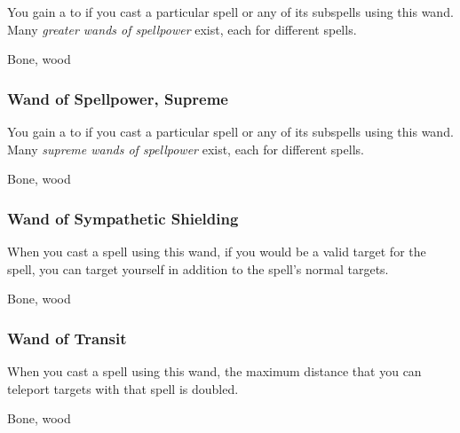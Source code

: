 You gain a   to  if you cast a particular spell or any of its subspells using this wand.
Many \textit{greater wands of spellpower} exist, each for different spells.



 


 Bone, wood


\lowercase{\hypertarget{item:Wand of Spellpower, Supreme}{}}\label{item:Wand of Spellpower, Supreme}
\hypertarget{item:Wand of Spellpower, Supreme}{\subsubsection{Wand of Spellpower, Supreme\hfill{}}}

You gain a   to  if you cast a particular spell or any of its subspells using this wand.
Many \textit{supreme wands of spellpower} exist, each for different spells.



 


 Bone, wood


\lowercase{\hypertarget{item:Wand of Sympathetic Shielding}{}}\label{item:Wand of Sympathetic Shielding}
\hypertarget{item:Wand of Sympathetic Shielding}{\subsubsection{Wand of Sympathetic Shielding\hfill{}}}

When you cast a   spell using this wand,
if you would be a valid target for the spell,
you can target yourself in addition to the spell's normal targets.



 


 Bone, wood


\lowercase{\hypertarget{item:Wand of Transit}{}}\label{item:Wand of Transit}
\hypertarget{item:Wand of Transit}{\subsubsection{Wand of Transit\hfill{}}}

When you cast a  spell using this wand,
the maximum distance that you can teleport targets with that spell is doubled.



 


 Bone, wood
